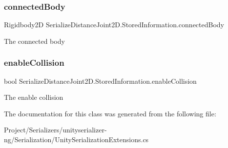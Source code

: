 \subsubsection{\texorpdfstring{connected\+Body}{connectedBody}}
{\footnotesize\ttfamily Rigidbody2D Serialize\+Distance\+Joint2\+D.\+Stored\+Information.\+connected\+Body}



The connected body 

\mbox{\label{class_serialize_distance_joint2_d_1_1_stored_information_ae306bdb9d3a3149698e4a2db0f905f0b}} 
\subsubsection{\texorpdfstring{enable\+Collision}{enableCollision}}
{\footnotesize\ttfamily bool Serialize\+Distance\+Joint2\+D.\+Stored\+Information.\+enable\+Collision}



The enable collision 



The documentation for this class was generated from the following file\+:\begin{DoxyCompactItemize}
\item 
Project/\+Serializers/unityserializer-\/ng/\+Serialization/Unity\+Serialization\+Extensions.\+cs\end{DoxyCompactItemize}
